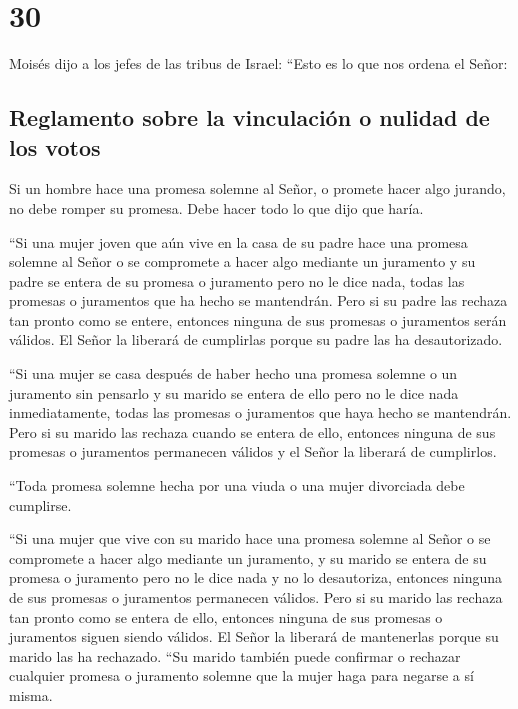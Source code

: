 \hypertarget{section-29}{%
\section{30}\label{section-29}}

 Moisés dijo a los jefes de las tribus de Israel: ``Esto
es lo que nos ordena el Señor:

\hypertarget{reglamento-sobre-la-vinculaciuxf3n-o-nulidad-de-los-votos}{%
\subsection{Reglamento sobre la vinculación o nulidad de los
votos}\label{reglamento-sobre-la-vinculaciuxf3n-o-nulidad-de-los-votos}}

 Si un hombre hace una promesa solemne al Señor, o promete
hacer algo jurando, no debe romper su promesa. Debe hacer todo lo que
dijo que haría.

 ``Si una mujer joven que aún vive en la casa de su padre
hace una promesa solemne al Señor o se compromete a hacer algo mediante
un juramento  y su padre se entera de su promesa o
juramento pero no le dice nada, todas las promesas o juramentos que ha
hecho se mantendrán.  Pero si su padre las rechaza tan
pronto como se entere, entonces ninguna de sus promesas o juramentos
serán válidos. El Señor la liberará de cumplirlas porque su padre las ha
desautorizado.

 ``Si una mujer se casa después de haber hecho una promesa
solemne o un juramento sin pensarlo  y su marido se entera
de ello pero no le dice nada inmediatamente, todas las promesas o
juramentos que haya hecho se mantendrán.  Pero si su
marido las rechaza cuando se entera de ello, entonces ninguna de sus
promesas o juramentos permanecen válidos y el Señor la liberará de
cumplirlos.

 ``Toda promesa solemne hecha por una viuda o una mujer
divorciada debe cumplirse.

 ``Si una mujer que vive con su marido hace una promesa
solemne al Señor o se compromete a hacer algo mediante un juramento,
 y su marido se entera de su promesa o juramento pero no
le dice nada y no lo desautoriza, entonces ninguna de sus promesas o
juramentos permanecen válidos.  Pero si su marido las
rechaza tan pronto como se entera de ello, entonces ninguna de sus
promesas o juramentos siguen siendo válidos. El Señor la liberará de
mantenerlas porque su marido las ha rechazado.  ``Su
marido también puede confirmar o rechazar cualquier promesa o juramento
solemne que la mujer haga para negarse a sí misma.

